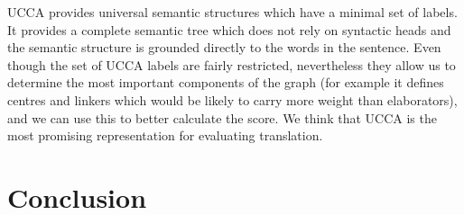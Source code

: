 \documentclass[11pt]{article}
\begin{document}
{UCCA provides universal semantic structures which 
have
a minimal set of labels. It provides a complete semantic tree which does not rely on syntactic heads and the semantic structure is grounded directly to the words in the sentence. 
 Even though the set of UCCA labels are fairly restricted,  nevertheless they allow us to determine the most important components of the graph (for example it defines centres and linkers which would be likely to carry more weight than elaborators), and we can use this to better calculate the score. 
We think that UCCA is the
most promising representation for evaluating translation. 
}

\section{Conclusion}





\end{document}
